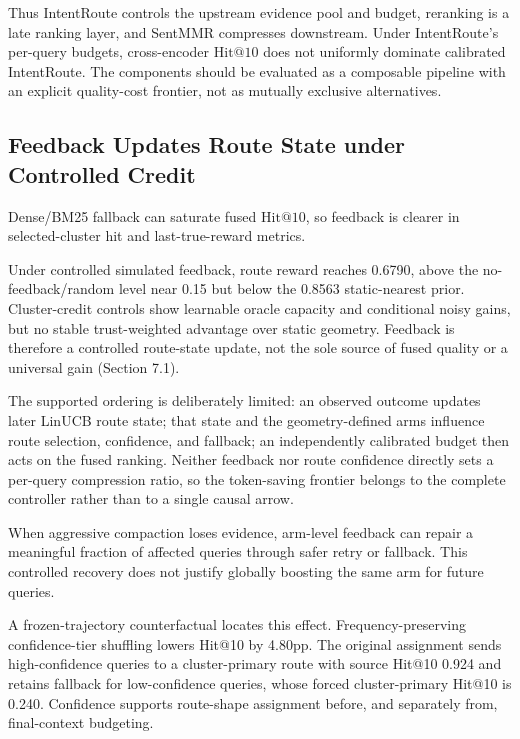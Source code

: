 Thus IntentRoute controls the upstream evidence pool and budget, reranking is a late ranking layer, and SentMMR compresses downstream. Under IntentRoute's per-query budgets, cross-encoder $\mathrm{Hit@10}$ does not uniformly dominate calibrated IntentRoute. The components should be evaluated as a composable pipeline with an explicit quality-cost frontier, not as mutually exclusive alternatives.

\subsection{Feedback Updates Route State under Controlled Credit}
\label{sec:07-discussion:feedback-updates-route-state-under-controlled-credit}

Dense/BM25 fallback can saturate fused $\mathrm{Hit@10}$, so feedback is clearer in selected-cluster hit and last-true-reward metrics.

Under controlled simulated feedback, route reward reaches 0.6790, above the no-feedback/random level near 0.15 but below the 0.8563 static-nearest prior. Cluster-credit controls show learnable oracle capacity and conditional noisy gains, but no stable trust-weighted advantage over static geometry. Feedback is therefore a controlled route-state update, not the sole source of fused quality or a universal gain (Section 7.1).

The supported ordering is deliberately limited: an observed outcome updates later LinUCB route state; that state and the geometry-defined arms influence route selection, confidence, and fallback; an independently calibrated budget then acts on the fused ranking. Neither feedback nor route confidence directly sets a per-query compression ratio, so the token-saving frontier belongs to the complete controller rather than to a single causal arrow.

When aggressive compaction loses evidence, arm-level feedback can repair a meaningful fraction of affected queries through safer retry or fallback. This controlled recovery does not justify globally boosting the same arm for future queries.

A frozen-trajectory counterfactual locates this effect. Frequency-preserving confidence-tier shuffling lowers Hit@10 by 4.80pp. The original assignment sends high-confidence queries to a cluster-primary route with source Hit@10 0.924 and retains fallback for low-confidence queries, whose forced cluster-primary Hit@10 is 0.240. Confidence supports route-shape assignment before, and separately from, final-context budgeting.

